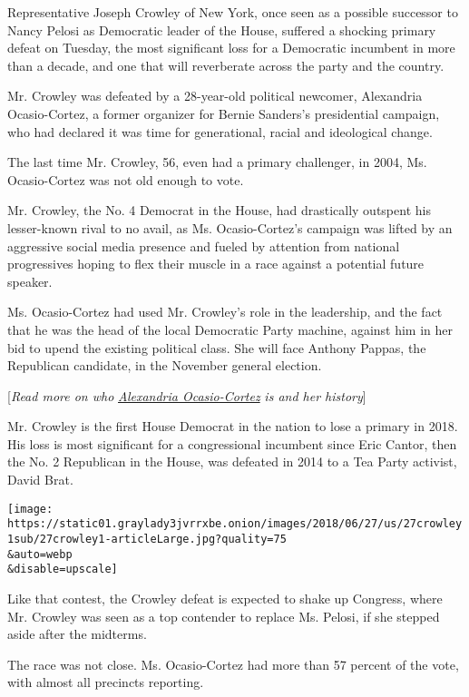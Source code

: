 Representative Joseph Crowley of New York, once seen as a possible
successor to Nancy Pelosi as Democratic leader of the House, suffered a
shocking primary defeat on Tuesday, the most significant loss for a
Democratic incumbent in more than a decade, and one that will
reverberate across the party and the country.

Mr. Crowley was defeated by a 28-year-old political newcomer, Alexandria
Ocasio-Cortez, a former organizer for Bernie Sanders's presidential
campaign, who had declared it was time for generational, racial and
ideological change.

The last time Mr. Crowley, 56, even had a primary challenger, in 2004,
Ms. Ocasio-Cortez was not old enough to vote.

Mr. Crowley, the No. 4 Democrat in the House, had drastically outspent
his lesser-known rival to no avail, as Ms. Ocasio-Cortez's campaign was
lifted by an aggressive social media presence and fueled by attention
from national progressives hoping to flex their muscle in a race against
a potential future speaker.

Ms. Ocasio-Cortez had used Mr. Crowley's role in the leadership, and the
fact that he was the head of the local Democratic Party machine, against
him in her bid to upend the existing political class. She will face
Anthony Pappas, the Republican candidate, in the November general
election.

{[}\emph{Read more on who}
\href{https://www.nytimes3xbfgragh.onion/2018/06/27/nyregion/alexandria-ocasio-cortez.html?action=click\&module=Intentional\&pgtype=Article}{\emph{Alexandria
Ocasio-Cortez}} \emph{is and her history}{]}

Mr. Crowley is the first House Democrat in the nation to lose a primary
in 2018. His loss is most significant for a congressional incumbent
since Eric Cantor, then the No. 2 Republican in the House, was defeated
in 2014 to a Tea Party activist, David Brat.

\texttt{[image: https://static01.graylady3jvrrxbe.onion/images/2018/06/27/us/27crowley1sub/27crowley1-articleLarge.jpg?quality=75\\\&auto=webp\\\&disable=upscale]}

Like that contest, the Crowley defeat is expected to shake up Congress,
where Mr. Crowley was seen as a top contender to replace Ms. Pelosi, if
she stepped aside after the midterms.

The race was not close. Ms. Ocasio-Cortez had more than 57 percent of
the vote, with almost all precincts reporting.

